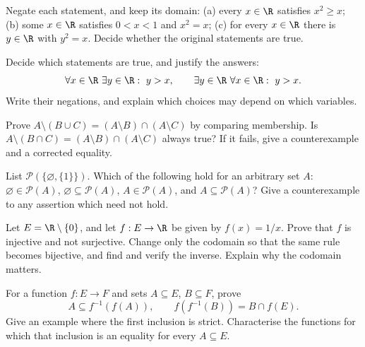 \begin{exercise}[$\star$]\label{ex:lang-negation}
Negate each statement, and keep its domain:
(a) every $x\in\R$ satisfies $x^2\ge x$;
(b) some $x\in\R$ satisfies $0<x<1$ and $x^2=x$;
(c) for every $x\in\R$ there is $y\in\R$ with $y^2=x$.
Decide whether the original statements are true.
\end{exercise}

\begin{exercise}[$\star$]\label{ex:lang-quantifiers}
Decide which statements are true, and justify the answers:
\[
\forall x\in\R\ \exists y\in\R:\ y>x,
\qquad
\exists y\in\R\ \forall x\in\R:\ y>x.
\]
Write their negations, and explain which choices may depend on which variables.
\end{exercise}

\begin{exercise}[$\star$]\label{ex:lang-setalgebra}
Prove $A\setminus(B\cup C)=(A\setminus B)\cap(A\setminus C)$ by comparing membership. Is $A\setminus(B\cap C)=(A\setminus B)\cap(A\setminus C)$ always true? If it fails, give a counterexample and a corrected equality.
\end{exercise}

\begin{exercise}[$\star$]\label{ex:lang-powerset}
List $\mathcal P(\{\varnothing,\{1\}\})$. Which of the following hold for an arbitrary set $A$:
$\varnothing\in\mathcal P(A)$, $\varnothing\subseteq\mathcal P(A)$, $A\in\mathcal P(A)$, and $A\subseteq\mathcal P(A)$?
Give a counterexample to any assertion which need not hold.
\end{exercise}

\begin{exercise}[$\star\star$]\label{ex:lang-domain}
Let $E=\R\setminus\{0\}$, and let $f:E\to\R$ be given by $f(x)=1/x$. Prove that $f$ is injective and not surjective. Change only the codomain so that the same rule becomes bijective, and find and verify the inverse. Explain why the codomain matters.
\end{exercise}

\begin{exercise}[$\star\star$]\label{ex:lang-inverseimage}
For a function $f:E\to F$ and sets $A\subseteq E$, $B\subseteq F$, prove
\[
A\subseteq f^{-1}(f(A)),\qquad f(f^{-1}(B))=B\cap f(E).
\]
Give an example where the first inclusion is strict. Characterise the functions for which that inclusion is an equality for every $A\subseteq E$.
\end{exercise}

